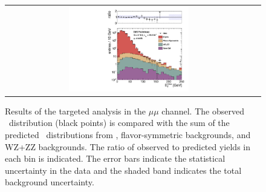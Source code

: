 \clearpage

\begin{figure}[!h]
\begin{center}
\begin{tabular}{cc}
\includegraphics[width=0.5\textwidth]{plots/pfmet_bveto_mm_19p5fb.pdf}
\end{tabular}
\caption{Results of the targeted analysis in the $\mu\mu$ channel. The observed \MET\ distribution (black points) is compared with the sum of the predicted \MET\
distributions from \zjets, flavor-symmetric backgrounds, and WZ+ZZ backgrounds. The ratio of observed to predicted yields in each bin is
indicated. The error bars indicate the statistical uncertainty in the data and the shaded band indicates the total background uncertainty.
\label{fig:results_targ_mm}
}
\end{center}
\end{figure}



